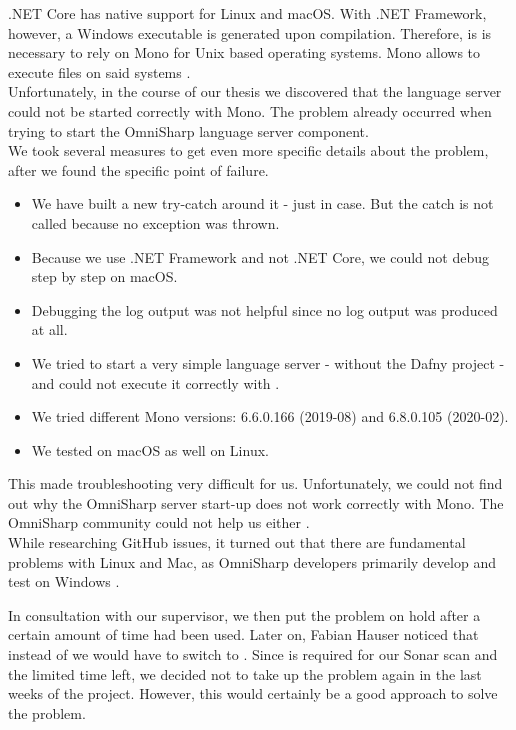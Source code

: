 .NET Core has native support for Linux and macOS.
With .NET Framework, however, a Windows executable is generated upon compilation.
Therefore, is is necessary to rely on Mono for Unix based operating systems.
Mono allows to execute  files on said systems \cite{mono}.  \\

Unfortunately, in the course of our thesis we discovered that the language server could not be started correctly with Mono.
The problem already occurred when trying to start the OmniSharp language server component. \\

We took several measures to get even more specific details about the problem, after we found the specific point of failure.

\begin{itemize}
    \item We have built a new try-catch around it - just in case. But the catch is not called because no exception was thrown.
    \item Because we use .NET Framework and not .NET Core, we could not debug step by step on macOS.
    \item Debugging the log output was not helpful since no log output was produced at all.
    \item We tried to start a very simple language server - without the Dafny project - and could not execute it correctly with .
    \item We tried different Mono versions: 6.6.0.166 (2019-08) and 6.8.0.105 (2020-02).
    \item We tested on macOS as well on Linux.
\end{itemize}

This made troubleshooting very difficult for us.
Unfortunately, we could not find out why the OmniSharp server start-up does not work correctly with Mono.
The OmniSharp community could not help us either \cite{mono-slack}.\\

While researching GitHub issues, it turned out that there are fundamental problems with Linux and Mac,
as OmniSharp developers primarily develop and test on Windows \cite{mono-git}.

In consultation with our supervisor, we then put the problem on hold after a certain amount of time had been used.
Later on, Fabian Hauser noticed that instead of  we would have to switch to .
Since  is required for our Sonar scan and the limited time left,
we decided not to take up the problem again in the last weeks of the project.
However, this would certainly be a good approach to solve the problem.


